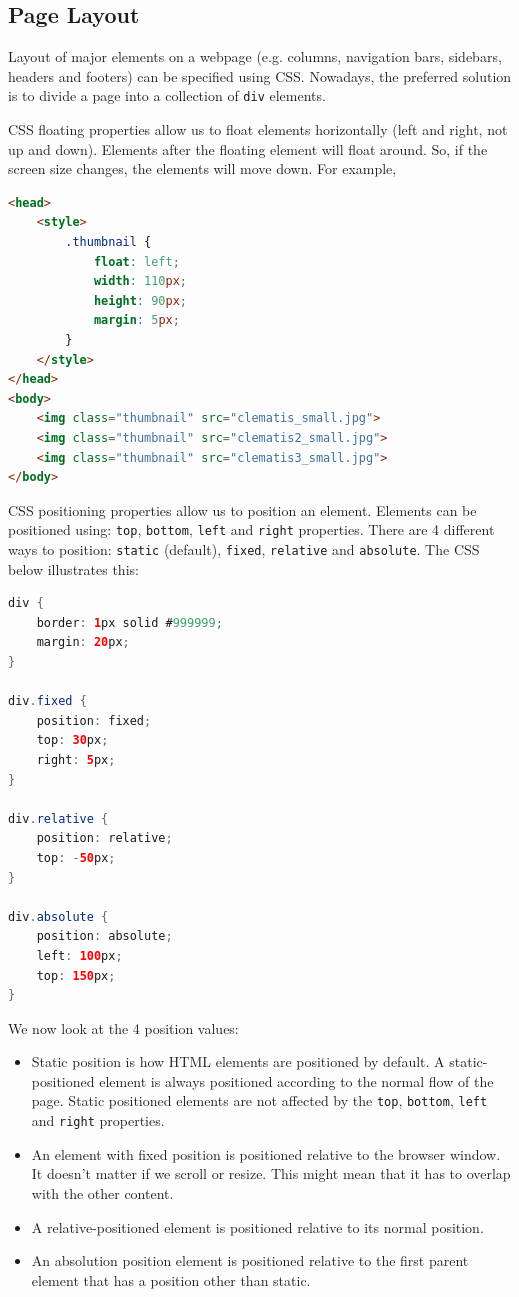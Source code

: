 \documentclass[a4paper, openany]{memoir}
\begin{document}
\subsection{Page Layout}
Layout of major elements on a webpage (e.g. columns, navigation bars, sidebars, headers and footers) can be specified using CSS. Nowadays, the preferred solution is to divide a page into a collection of \texttt{div} elements.

\noindent CSS floating properties allow us to float elements horizontally (left and right, not up and down). Elements after the floating element will float around. So, if the screen size changes, the elements will move down. For example,
\begin{lstlisting}[language=html]
<head>
    <style>
        .thumbnail {
            float: left;
            width: 110px;
            height: 90px;
            margin: 5px;
        }
    </style>
</head>
<body>
    <img class="thumbnail" src="clematis_small.jpg">
    <img class="thumbnail" src="clematis2_small.jpg">
    <img class="thumbnail" src="clematis3_small.jpg">
</body>
\end{lstlisting}
CSS positioning properties allow us to position an element. Elements can be positioned using: \texttt{top}, \texttt{bottom}, \texttt{left} and \texttt{right} properties. There are 4 different ways to position: \texttt{static} (default), \texttt{fixed}, \texttt{relative} and \texttt{absolute}. The CSS below illustrates this:
\begin{lstlisting}[language=java]
div {
    border: 1px solid #999999;
    margin: 20px;
}

div.fixed {
    position: fixed;
    top: 30px;
    right: 5px;
}

div.relative {
    position: relative;
    top: -50px;
}

div.absolute {
    position: absolute;
    left: 100px;
    top: 150px;
}
\end{lstlisting}
We now look at the 4 position values:
\begin{itemize}
    \item Static position is how HTML elements are positioned by default. A static-positioned element is always positioned according to the normal flow of the page. Static positioned elements are not affected by the \texttt{top}, \texttt{bottom}, \texttt{left} and \texttt{right} properties.
    \item An element with fixed position is positioned relative to the browser window. It doesn't matter if we scroll or resize. This might mean that it has to overlap with the other content.
    \item A relative-positioned element is positioned relative to its normal position.
    \item An absolution position element is positioned relative to the first parent element that has a position other than static.
\end{itemize}
\end{document}
